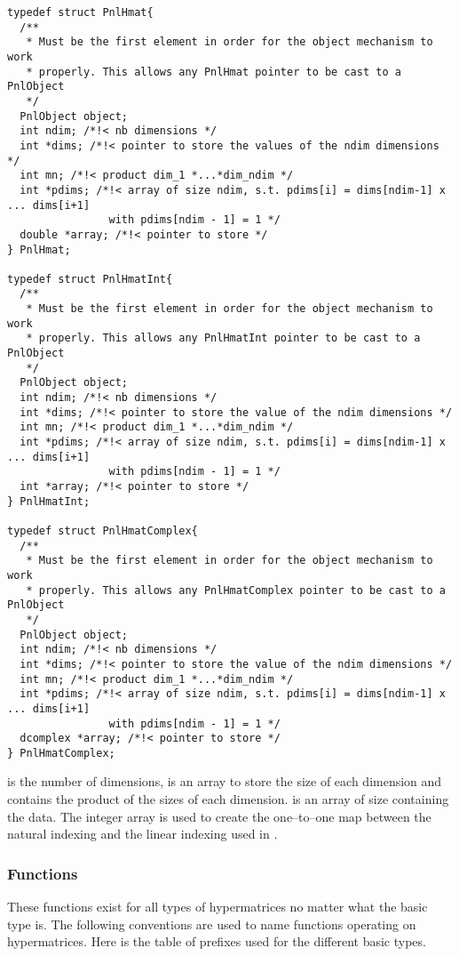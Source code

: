 \begin{verbatim}
typedef struct PnlHmat{
  /**
   * Must be the first element in order for the object mechanism to work
   * properly. This allows any PnlHmat pointer to be cast to a PnlObject
   */
  PnlObject object; 
  int ndim; /*!< nb dimensions */ 
  int *dims; /*!< pointer to store the values of the ndim dimensions */ 
  int mn; /*!< product dim_1 *...*dim_ndim */
  int *pdims; /*!< array of size ndim, s.t. pdims[i] = dims[ndim-1] x ... dims[i+1]
                with pdims[ndim - 1] = 1 */
  double *array; /*!< pointer to store */
} PnlHmat;

typedef struct PnlHmatInt{
  /**
   * Must be the first element in order for the object mechanism to work
   * properly. This allows any PnlHmatInt pointer to be cast to a PnlObject
   */
  PnlObject object; 
  int ndim; /*!< nb dimensions */ 
  int *dims; /*!< pointer to store the value of the ndim dimensions */ 
  int mn; /*!< product dim_1 *...*dim_ndim */
  int *pdims; /*!< array of size ndim, s.t. pdims[i] = dims[ndim-1] x ... dims[i+1]
                with pdims[ndim - 1] = 1 */
  int *array; /*!< pointer to store */
} PnlHmatInt;

typedef struct PnlHmatComplex{
  /**
   * Must be the first element in order for the object mechanism to work
   * properly. This allows any PnlHmatComplex pointer to be cast to a PnlObject
   */
  PnlObject object; 
  int ndim; /*!< nb dimensions */ 
  int *dims; /*!< pointer to store the value of the ndim dimensions */ 
  int mn; /*!< product dim_1 *...*dim_ndim */
  int *pdims; /*!< array of size ndim, s.t. pdims[i] = dims[ndim-1] x ... dims[i+1]
                with pdims[ndim - 1] = 1 */
  dcomplex *array; /*!< pointer to store */
} PnlHmatComplex;
\end{verbatim}
 is the number of dimensions,  is an array to store the
size of each dimension and  contains the product of the sizes of each
dimension.  is an array of size  containing the data. The
integer array  is used to create the one--to--one map between the
natural indexing and the linear indexing used in .


\subsubsection{Functions}
These functions exist for all types of hypermatrices no matter what the basic type
is. The following conventions are used to name functions operating on hypermatrices.
Here is the table of prefixes used for the different basic types.

